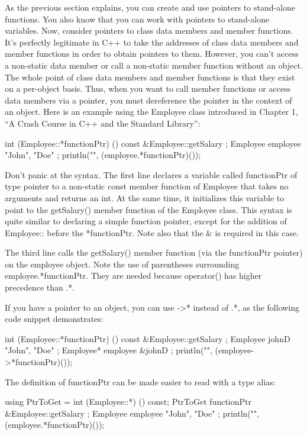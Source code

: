 As the previous section explains, you can create and use pointers to stand-alone functions. You also know that you can work with pointers to stand-alone variables. Now, consider pointers to class data members and member functions. It’s perfectly legitimate in C++ to take the addresses of class data members and member functions in order to obtain pointers to them. However, you can’t access a non-static data member or call a non-static member function without an object. The whole point of class data members and member functions is that they exist on a per-object basis. Thus, when you want to call member functions or access data members via a pointer, you must dereference the pointer in the context of an object. Here is an example using the Employee class introduced in Chapter 1, “A Crash Course in C++ and the Standard Library”:

\begin{cpp}
int (Employee::*functionPtr) () const { &Employee::getSalary };
Employee employee { "John", "Doe" };
println("{}", (employee.*functionPtr)());
\end{cpp}

Don’t panic at the syntax. The first line declares a variable called functionPtr of type pointer to a non-static const member function of Employee that takes no arguments and returns an int. At the same time, it initializes this variable to point to the getSalary() member function of the Employee class. This syntax is quite similar to declaring a simple function pointer, except for the addition of Employee:: before the *functionPtr. Note also that the \& is required in this case.

The third line calls the getSalary() member function (via the functionPtr pointer) on the employee object. Note the use of parentheses surrounding employee.*functionPtr. They are needed because operator() has higher precedence than .*.

If you have a pointer to an object, you can use ->* instead of .*, as the following code snippet demonstrates:

\begin{cpp}
int (Employee::*functionPtr) () const { &Employee::getSalary };
Employee johnD { "John", "Doe" };
Employee* employee { &johnD };
println("{}", (employee->*functionPtr)());
\end{cpp}

The definition of functionPtr can be made easier to read with a type alias:

\begin{cpp}
using PtrToGet = int (Employee::*) () const;
PtrToGet functionPtr { &Employee::getSalary };
Employee employee { "John", "Doe" };
println("{}", (employee.*functionPtr)());
\end{cpp}

